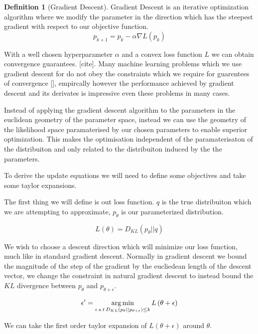 \documentclass[12pt, a4paper]{report}
\theoremstyle{definition}
\theoremstyle{definition}
\newtheorem{definition}{Definition}[section]
\theoremstyle{definition}
\begin{document}
\begin{definition}[Gradient Descent]
    Gradient Descent is an iterative optimization algorithm where we modify the parameter in the direction which has the steepest gradient with respect to our objective function.
    $$p_{k+1} = p_{k} -  \alpha \nabla L(p_k)$$
\end{definition}

With a well chosen hyperparameter $\alpha$ and a convex loss function $L$ we can obtain convergence guarantees. [cite]. Many machine learning problems which we use gradient descent for do not obey the constraints which we require for guarentees of convergence [], empircally however the performance achieved by gradient descent and its derivates is impressive even these problems in many cases.

Instead of applying the gradient descent algorithm to the parameters in the euclidean geometry of the parameter space, instead we can use the geometry of the likelihood space paramaterised by our chosen parameters to enable superior optimization. This makes the optimisation independent of the paramaterisaton of the distribuiton and only related to the distribuiton induced by the the parameters.
 
To derive the update equations we will need to define some objectives and take some taylor expansions.

The first thing we will define is out loss function. $q$ is the true distribuiton which we are attempting to approximate, $p_\theta$ is our parameterized distribution.

$$L \left(\theta \right) = D_{KL} \left(p_\theta || q \right) $$

We wish to choose a descent direction which will minimize our loss function, much like in standard gradient descent. Normally in gradient descent we bound the magnitude of the step of the gradient by the eucliedean length of the descent vector, we change the constraint in natural gradient descent to instead bound the $KL$ divergence between $p_\theta$ and $p_{\theta + \epsilon}$.

\begin{align}
    \epsilon^\prime &= \operatorname*{arg\,min}_{\epsilon \, s.t \, D_{KL} \left(p_\theta || p_{\theta + \epsilon} \right) \leq k} L \left( \theta + \epsilon \right) \\
\end{align}

We can take the first order taylor expansion of $L\left(\theta + \epsilon\right)$ around $\theta$.
\end{document}

